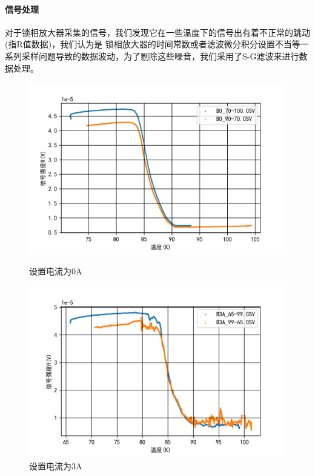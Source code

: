 \documentclass{ctexart}
\theoremstyle{ansstyle}
\begin{document}
\paragraph{信号处理} 对于锁相放大器采集的信号，我们发现它在一些温度下的信号出有着不正常的跳动(指R值数据)，我们认为是
锁相放大器的时间常数或者滤波微分积分设置不当等一系列采样问题导致的数据波动，为了剔除这些噪音，我们采用了S-G滤波来进行数据处理。
\begin{figure}[H]
    \centering
    \begin{minipage}[t]{0.48\linewidth}
        \centering
        \includegraphics[width=0.9\linewidth]{./png/2.png}
        \caption{设置电流为0A}
    \end{minipage}
    \begin{minipage}[t]{0.48\linewidth}
        \centering
        \includegraphics[width=0.9\linewidth]{./png/6.png}
        \caption{设置电流为3A}
    \end{minipage}
    \quad
    \begin{minipage}[t]{0.6\linewidth}
        \centering

\end{minipage}
\end{figure}
\end{document}
